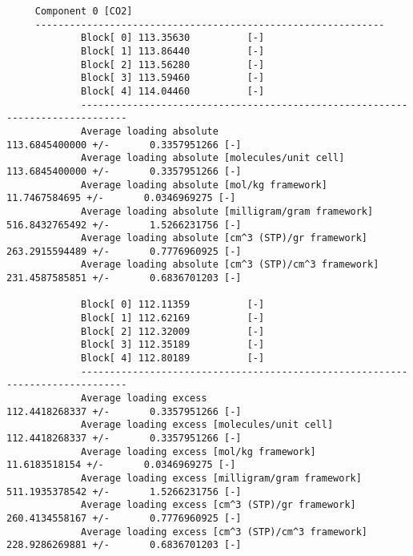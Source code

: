 \begin{tiny}
\begin{verbatim}
     Component 0 [CO2]
     -------------------------------------------------------------
             Block[ 0] 113.35630          [-]
             Block[ 1] 113.86440          [-]
             Block[ 2] 113.56280          [-]
             Block[ 3] 113.59460          [-]
             Block[ 4] 114.04460          [-]
             ------------------------------------------------------------------------------
             Average loading absolute                            113.6845400000 +/-       0.3357951266 [-]
             Average loading absolute [molecules/unit cell]      113.6845400000 +/-       0.3357951266 [-]
             Average loading absolute [mol/kg framework]                 11.7467584695 +/-       0.0346969275 [-]
             Average loading absolute [milligram/gram framework]        516.8432765492 +/-       1.5266231756 [-]
             Average loading absolute [cm^3 (STP)/gr framework]         263.2915594489 +/-       0.7776960925 [-]
             Average loading absolute [cm^3 (STP)/cm^3 framework]       231.4587585851 +/-       0.6836701203 [-]

             Block[ 0] 112.11359          [-]
             Block[ 1] 112.62169          [-]
             Block[ 2] 112.32009          [-]
             Block[ 3] 112.35189          [-]
             Block[ 4] 112.80189          [-]
             ------------------------------------------------------------------------------
             Average loading excess                            112.4418268337 +/-       0.3357951266 [-]
             Average loading excess [molecules/unit cell]      112.4418268337 +/-       0.3357951266 [-]
             Average loading excess [mol/kg framework]                   11.6183518154 +/-       0.0346969275 [-]
             Average loading excess [milligram/gram framework]          511.1935378542 +/-       1.5266231756 [-]
             Average loading excess [cm^3 (STP)/gr framework]           260.4134558167 +/-       0.7776960925 [-]
             Average loading excess [cm^3 (STP)/cm^3 framework]         228.9286269881 +/-       0.6836701203 [-]
\end{verbatim}
\end{tiny}

